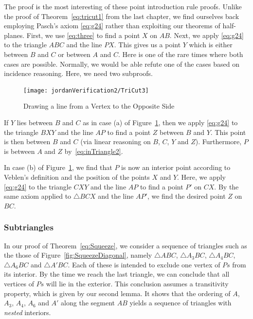 The proof is the most interesting of these point introduction rule proofs. Unlike the proof of Theorem~\ref{eq:tricut1} from the last chapter, we find ourselves back employing Pasch's axiom \eqref{eq:g24} rather than exploiting our theorems of half-planes. First, we use \ref{eq:three} to find a point $X$ on $AB$. Next, we apply \eqref{eq:g24} to the triangle $ABC$ and the line $PX$. This gives us a point $Y$ which is either between $B$ and $C$ or between $A$ and $C$. Here is one of the rare times where both cases are possible. Normally, we would be able refute one of the cases based on incidence reasoning. Here, we need two subproofs.

\begin{figure}
\centering\texttt{[image: jordanVerification2/TriCut3]}
\caption{Drawing a line from a Vertex to the Opposite Side}
\label{fig:TriCut3}
\end{figure}

If $Y$ lies between $B$ and $C$ as in case (a) of Figure~\ref{fig:TriCut3}, then we apply \eqref{eq:g24} to the triangle $BXY$ and the line $AP$ to find a point $Z$ between $B$ and $Y$. This point is then between $B$ and $C$ (via linear reasoning on $B$, $C$, $Y$ and $Z$). Furthermore, $P$ is between $A$ and $Z$ by~\eqref{eq:inTriangle2}.

In case (b) of Figure~\ref{fig:TriCut3}, we find that $P$ is now an interior point according to Veblen's definition and the position of the points $X$ and $Y$. Here, we apply \eqref{eq:g24} to the triangle $CXY$ and the line $AP$ to find a point $P'$ on $CX$. By the same axiom applied to $\triangle BCX$ and the line $AP'$, we find the desired point $Z$ on $BC$.

\subsubsection{Subtriangles}\label{sec:Subtriangles}
In our proof of Theorem~\ref{eq:Squeeze}, we consider a sequence of triangles such as the those of Figure~\ref{fig:SqueezeDiagonal}, namely $\triangle ABC$, $\triangle A_3BC$, $\triangle A_4BC$, $\triangle A_6BC$ and $\triangle A'BC$. Each of these is intended to exclude one vertex of $Ps$ from its interior. By the time we reach the last triangle, we can conclude that all vertices of $Ps$ will lie in the exterior. This conclusion assumes a transitivity property, which is given by our second lemma. It shows that the ordering of $A$, $A_3$, $A_4$, $A_6$ and $A'$ along the segment $AB$ yields a sequence of triangles with \emph{nested} interiors. 

